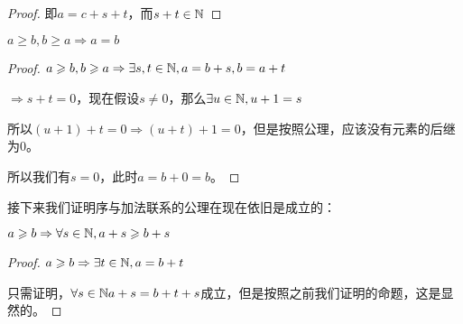 \documentclass[12pt, a4paper, oneside, UTF8]{ctexbook}
\begin{document}
\begin{para}{0}
\begin{proof}
						即$a=c+s+t$，而$s+t\in\mathbb{N}$
					\end{proof}
					\begin{proposition}
						$a \geqslant b,b\geqslant a \Rightarrow a=b$
					\end{proposition}
					\begin{proof}
						$a \geqslant b,b\geqslant a \Rightarrow \exists s,t \in \mathbb{N},a=b+s,b=a+t$
						
						$\Rightarrow s+t=0$，现在假设$s\neq 0$，那么$\exists u\in\mathbb{N},u+1=s$
						
						所以$(u+1)+t=0\Rightarrow (u+t)+1=0$，但是按照公理，应该没有元素的后继为$0$。
						
						所以我们有$s=0$，此时$a=b+0=b$。
					\end{proof}
					接下来我们证明序与加法联系的公理在现在依旧是成立的：
					\begin{proposition}
						$a \geqslant b \Rightarrow \forall s\in\mathbb{N},a+s \geqslant b+s$
					\end{proposition}
					\begin{proof}
						$a \geqslant b \Rightarrow \exists t\in\mathbb{N},a=b+t$
						
						只需证明，$\forall s \in \mathbb{N} a+s=b+t+s$成立，但是按照之前我们证明的命题，这是显然的。
					\end{proof}
			\end{para}
\end{document}
